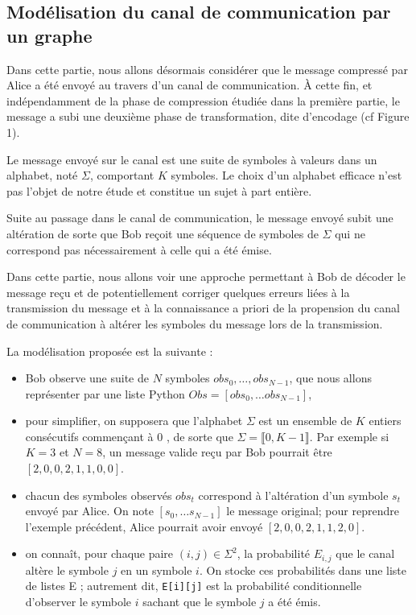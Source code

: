 \subsection{Modélisation du canal de communication par un graphe}
Dans cette partie, nous allons désormais considérer que le message compressé par Alice a été envoyé au travers d'un canal de communication. À cette fin, et indépendamment de la phase de compression étudiée dans la première partie, le message a subi une deuxième phase de transformation, dite d'encodage (cf Figure 1).

Le message envoyé sur le canal est une suite de symboles à valeurs dans un alphabet, noté $\Sigma$, comportant $K$ symboles. Le choix d'un alphabet efficace n'est pas l'objet de notre étude et constitue un sujet à part entière.

Suite au passage dans le canal de communication, le message envoyé subit une altération de sorte que Bob reçoit une séquence de symboles de $\Sigma$ qui ne correspond pas nécessairement à celle qui a été émise.

Dans cette partie, nous allons voir une approche permettant à Bob de décoder le message reçu et de potentiellement corriger quelques erreurs liées à la transmission du message et à la connaissance a priori de la propension du canal de communication à altérer les symboles du message lors de la transmission.

La modélisation proposée est la suivante :

\begin{itemize}
  \item Bob observe une suite de $N$ symboles $o b s_{0}, \ldots, o b s_{N-1}$, que nous allons représenter par une liste Python $O b s=\left[o b s_{0}, \ldots o b s_{N-1}\right]$,
  \item pour simplifier, on supposera que l'alphabet $\Sigma$ est un ensemble de $K$ entiers consécutifs commençant à 0 , de sorte que $\Sigma=\llbracket 0, K-1 \rrbracket$. Par exemple si $K=3$ et $N=8$, un message valide reçu par Bob pourrait être $[2,0,0,2,1,1,0,0]$.
  \item chacun des symboles observés $o b s_{t}$ correspond à l'altération d'un symbole $s_{t}$ envoyé par Alice. On note $\left[s_{0}, \ldots s_{N-1}\right]$ le message original; pour reprendre l'exemple précédent, Alice pourrait avoir envoyé $[2,0,0,2,1,1,2,0]$.
  \item on connaît, pour chaque paire $(i, j) \in \Sigma^{2}$, la probabilité $E_{i, j}$ que le canal altère le symbole $j$ en un symbole $i$. On stocke ces probabilités dans une liste de listes E ; autrement dit, \lstinline{E[i][j]} est la probabilité conditionnelle d'observer le symbole $i$ sachant que le symbole $j$ a été émis.
\end{itemize}

